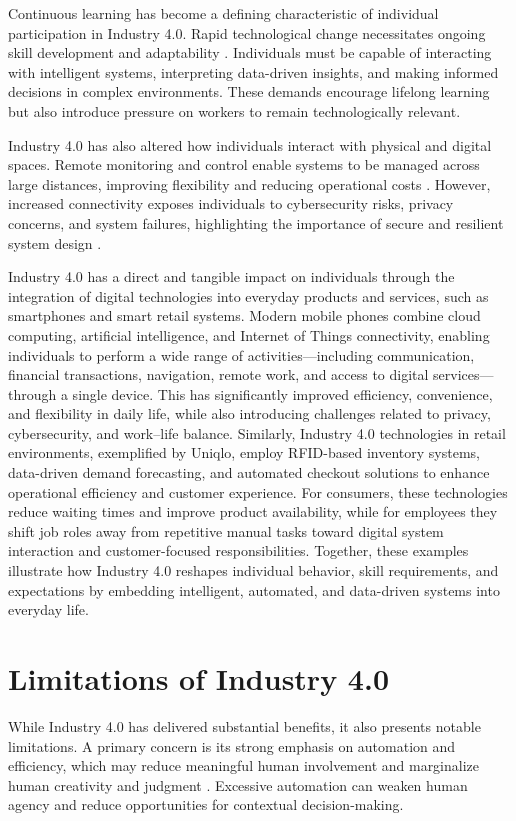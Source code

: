 \documentclass[conference]{IEEEtran}
\begin{document}
Continuous learning has become a defining characteristic of individual participation in Industry 4.0. Rapid technological change necessitates ongoing skill development and adaptability \cite{stock2016}. Individuals must be capable of interacting with intelligent systems, interpreting data-driven insights, and making informed decisions in complex environments. These demands encourage lifelong learning but also introduce pressure on workers to remain technologically relevant.

Industry 4.0 has also altered how individuals interact with physical and digital spaces. Remote monitoring and control enable systems to be managed across large distances, improving flexibility and reducing operational costs \cite{fao2020}. However, increased connectivity exposes individuals to cybersecurity risks, privacy concerns, and system failures, highlighting the importance of secure and resilient system design \cite{mtetwa2022}.

Industry 4.0 has a direct and tangible impact on individuals through the integration of digital technologies into everyday products and services, such as smartphones and smart retail systems. Modern mobile phones combine cloud computing, artificial intelligence, and Internet of Things connectivity, enabling individuals to perform a wide range of activities—including communication, financial transactions, navigation, remote work, and access to digital services—through a single device. This has significantly improved efficiency, convenience, and flexibility in daily life, while also introducing challenges related to privacy, cybersecurity, and work–life balance. Similarly, Industry 4.0 technologies in retail environments, exemplified by Uniqlo, employ RFID-based inventory systems, data-driven demand forecasting, and automated checkout solutions to enhance operational efficiency and customer experience. For consumers, these technologies reduce waiting times and improve product availability, while for employees they shift job roles away from repetitive manual tasks toward digital system interaction and customer-focused responsibilities. Together, these examples illustrate how Industry 4.0 reshapes individual behavior, skill requirements, and expectations by embedding intelligent, automated, and data-driven systems into everyday life.

\section{Limitations of Industry 4.0}
While Industry 4.0 has delivered substantial benefits, it also presents notable limitations. A primary concern is its strong emphasis on automation and efficiency, which may reduce meaningful human involvement and marginalize human creativity and judgment \cite{pfeiffer2017}. Excessive automation can weaken human agency and reduce opportunities for contextual decision-making.
\end{document}

